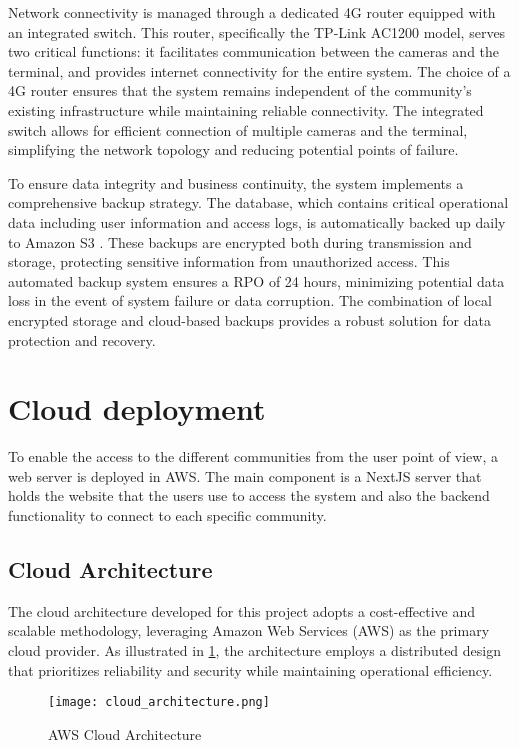 Network connectivity is managed through a dedicated 4G router equipped with an integrated switch. This router, specifically the TP-Link AC1200 model, serves two critical functions: it facilitates communication between the cameras and the terminal, and provides internet connectivity for the entire system. The choice of a 4G router ensures that the system remains independent of the community's existing infrastructure while maintaining reliable connectivity. The integrated switch allows for efficient connection of multiple cameras and the terminal, simplifying the network topology and reducing potential points of failure.

To ensure data integrity and business continuity, the system implements a comprehensive backup strategy. The database, which contains critical operational data including user information and access logs, is automatically backed up daily to Amazon S3 \autocite{AmazonS3}. These backups are encrypted both during transmission and storage, protecting sensitive information from unauthorized access. This automated backup system ensures a \gls{RPO} of 24 hours, minimizing potential data loss in the event of system failure or data corruption. The combination of local encrypted storage and cloud-based backups provides a robust solution for data protection and recovery.

\section{Cloud deployment}

To enable the access to the different communities from the user point of view, a web server is deployed in AWS. The main component is a NextJS server that holds the website that the users use to access the system and also the backend functionality to connect to each specific community.

\subsection{Cloud Architecture}

The cloud architecture developed for this project adopts a cost-effective and scalable methodology, leveraging Amazon Web Services (AWS) as the primary cloud provider. As illustrated in \cref{fig:cloud_architecture}, the architecture employs a distributed design that prioritizes reliability and security while maintaining operational efficiency.

\begin{figure}
	\texttt{[image: cloud\_architecture.png]}
	\caption{AWS Cloud Architecture} \label{fig:cloud_architecture}
\end{figure}

